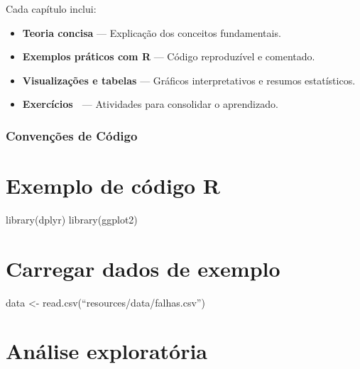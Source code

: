 \documentclass[
  letterpaper,
]{book}
\providecommand{\tightlist}{%
  \setlength{\itemsep}{0pt}\setlength{\parskip}{0pt}}\usepackage{longtable,booktabs,array}
\begin{document}
Cada capítulo inclui:

\begin{itemize}
\tightlist
\item
  \textbf{Teoria concisa} --- Explicação dos conceitos fundamentais.
\item
  \textbf{Exemplos práticos com R} --- Código reproduzível e comentado.
\item
  \textbf{Visualizações e tabelas} --- Gráficos interpretativos e
  resumos estatísticos.
\item
  \textbf{Exercícios} 📝 --- Atividades para consolidar o aprendizado.
\end{itemize}

\subsection*{Convenções de Código}\label{convenuxe7uxf5es-de-cuxf3digo}


\chapter*{Exemplo de código R}\label{exemplo-de-cuxf3digo-r}


library(dplyr) library(ggplot2)


\chapter*{Carregar dados de exemplo}\label{carregar-dados-de-exemplo}


data \textless- read.csv(``resources/data/falhas.csv'')


\chapter*{Análise exploratória}\label{anuxe1lise-exploratuxf3ria}

\end{document}
